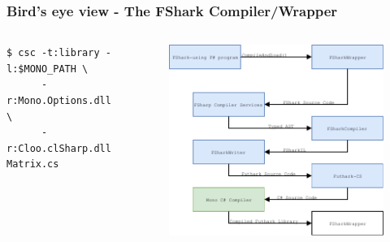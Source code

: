 \documentclass[10pt, compress, usenames, dvipsnames]{beamer}
\begin{document}
\begin{frame}[fragile]
  \frametitle{Bird's eye view - The FShark Compiler/Wrapper}
\begin{columns}[t] %
\begin{column}{.38\textwidth}
    \begin{verbatim}
$ csc -t:library -l:$MONO_PATH \
      -r:Mono.Options.dll \
      -r:Cloo.clSharp.dll Matrix.cs
    \end{verbatim}
\end{column}
\hfill
\begin{column}{.60\textwidth}
  \begin{figure}
    \includegraphics[scale=0.7]{./images/pipeline/pipeline8}
  \end{figure}
\end{column}
\end{columns}
\end{frame}
\end{document}
